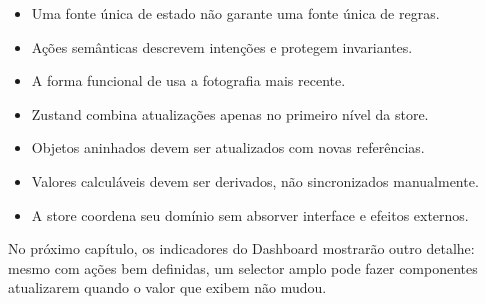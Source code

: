 \begin{resumo}
\begin{itemize}
  \item Uma fonte única de estado não garante uma fonte única de regras.
  \item Ações semânticas descrevem intenções e protegem invariantes.
  \item A forma funcional de  usa a fotografia mais recente.
  \item Zustand combina atualizações apenas no primeiro nível da store.
  \item Objetos aninhados devem ser atualizados com novas referências.
  \item Valores calculáveis devem ser derivados, não sincronizados manualmente.
  \item A store coordena seu domínio sem absorver interface e efeitos externos.
\end{itemize}
\end{resumo}

No próximo capítulo, os indicadores do Dashboard mostrarão outro detalhe: mesmo
com ações bem definidas, um selector amplo pode fazer componentes atualizarem
quando o valor que exibem não mudou.
